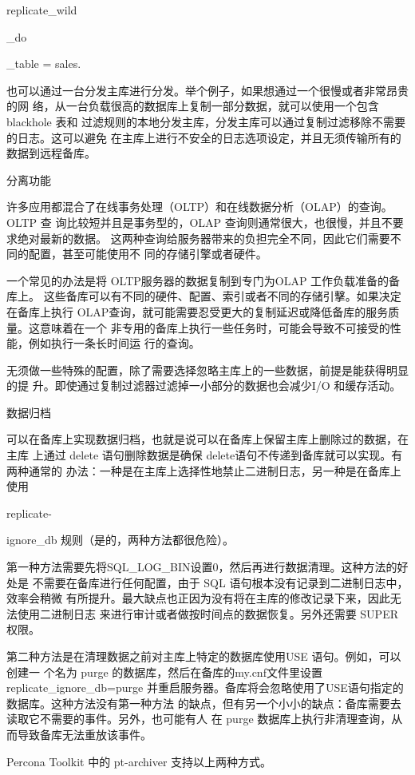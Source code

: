 replicate\_wild

\_do

\_table = sales.%

也可以通过一台分发主库进行分发。举个例子，如果想通过一个很慢或者非常昂贵的网
络，从一台负载很高的数据库上复制一部分数据，就可以使用一个包含blackhole 表和
过滤规则的本地分发主库，分发主库可以通过复制过滤移除不需要的日志。这可以避免
在主库上进行不安全的日志选项设定，并且无须传输所有的数据到远程备库。

分离功能

许多应用都混合了在线事务处理（OLTP）和在线数据分析（OLAP）的查询。OLTP 查
询比较短并且是事务型的，OLAP 查询则通常很大，也很慢，并且不要求绝对最新的数据。
这两种查询给服务器带来的负担完全不同，因此它们需要不同的配置，甚至可能使用不
同的存储引擎或者硬件。

一个常见的办法是将 OLTP服务器的数据复制到专门为OLAP 工作负载准备的备库上。
这些备库可以有不同的硬件、配置、索引或者不同的存储引擊。如果决定在备库上执行
OLAP查询，就可能需要忍受更大的复制延迟或降低备库的服务质量。这意味着在一个
非专用的备库上执行一些任务时，可能会导致不可接受的性能，例如执行一条长时间运
行的查询。

无须做一些特殊的配置，除了需要选择忽略主库上的一些数据，前提是能获得明显的提
升。即使通过复制过滤器过滤掉一小部分的数据也会减少I/O 和缓存活动。

数据归档

可以在备库上实现数据归档，也就是说可以在备库上保留主库上删除过的数据，在主库
上通过 delete 语句删除数据是确保 delete语句不传递到备库就可以实现。有两种通常的
办法：一种是在主库上选择性地禁止二进制日志，另一种是在备库上使用

replicate-

ignore\_db 规则（是的，两种方法都很危险）。

第一种方法需要先将SQL\_LOG\_BIN设置0，然后再进行数据清理。这种方法的好处是
不需要在备库进行任何配置，由于 SQL 语句根本没有记录到二进制日志中，效率会稍微
有所提升。最大缺点也正因为没有将在主库的修改记录下来，因此无法使用二进制日志
来进行审计或者做按时间点的数据恢复。另外还需要 SUPER 权限。

第二种方法是在清理数据之前对主库上特定的数据库使用USE 语句。例如，可以创建一
个名为 purge 的数据库，然后在备库的my.cnf文件里设置 replicate\_ignore\_db=purge
并重启服务器。备库将会忽略使用了USE语句指定的数据库。这种方法没有第一种方法
的缺点，但有另一个小小的缺点：备库需要去读取它不需要的事件。另外，也可能有人
在 purge 数据库上执行非清理查询，从而导致备库无法重放该事件。

Percona Toolkit 中的 pt-archiver 支持以上两种方式。

